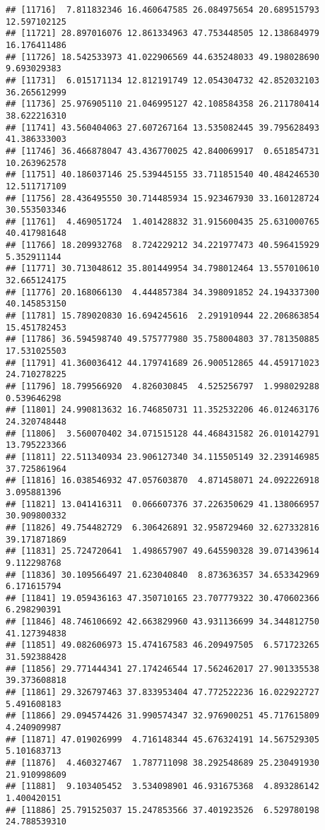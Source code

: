 \documentclass[
]{article}
\begin{document}
\begin{verbatim}
## [11716]  7.811832346 16.460647585 26.084975654 20.689515793 12.597102125
## [11721] 28.897016076 12.861334963 47.753448505 12.138684979 16.176411486
## [11726] 18.542533973 41.022906569 44.635248033 49.198028690  9.693029383
## [11731]  6.015171134 12.812191749 12.054304732 42.852032103 36.265612999
## [11736] 25.976905110 21.046995127 42.108584358 26.211780414 38.622216310
## [11741] 43.560404063 27.607267164 13.535082445 39.795628493 41.386333003
## [11746] 36.466878047 43.436770025 42.840069917  0.651854731 10.263962578
## [11751] 40.186037146 25.539445155 33.711851540 40.484246530 12.511717109
## [11756] 28.436495550 30.714485934 15.923467930 33.160128724 30.553503346
## [11761]  4.469051724  1.401428832 31.915600435 25.631000765 40.417981648
## [11766] 18.209932768  8.724229212 34.221977473 40.596415929  5.352911144
## [11771] 30.713048612 35.801449954 34.798012464 13.557010610 32.665124175
## [11776] 20.168066130  4.444857384 34.398091852 24.194337300 40.145853150
## [11781] 15.789020830 16.694245616  2.291910944 22.206863854 15.451782453
## [11786] 36.594598740 49.575777980 35.758004803 37.781350885 17.531025503
## [11791] 41.360036412 44.179741689 26.900512865 44.459171023 24.710278225
## [11796] 18.799566920  4.826030845  4.525256797  1.998029288  0.539646298
## [11801] 24.990813632 16.746850731 11.352532206 46.012463176 24.320748448
## [11806]  3.560070402 34.071515128 44.468431582 26.010142791 13.795223366
## [11811] 22.511340934 23.906127340 34.115505149 32.239146985 37.725861964
## [11816] 16.038546932 47.057603870  4.871458071 24.092226918  3.095881396
## [11821] 13.041416311  0.066607376 37.226350629 41.138066957 30.909800332
## [11826] 49.754482729  6.306426891 32.958729460 32.627332816 39.171871869
## [11831] 25.724720641  1.498657907 49.645590328 39.071439614  9.112298768
## [11836] 30.109566497 21.623040840  8.873636357 34.653342969  6.171615794
## [11841] 19.059436163 47.350710165 23.707779322 30.470602366  6.298290391
## [11846] 48.746106692 42.663829960 43.931136699 34.344812750 41.127394838
## [11851] 49.082606973 15.474167583 46.209497505  6.571723265 31.592388428
## [11856] 29.771444341 27.174246544 17.562462017 27.901335538 39.373608818
## [11861] 29.326797463 37.833953404 47.772522236 16.022922727  5.491608183
## [11866] 29.094574426 31.990574347 32.976900251 45.717615809  4.240909987
## [11871] 47.019026999  4.716148344 45.676324191 14.567529305  5.101683713
## [11876]  4.460327467  1.787711098 38.292548689 25.230491930 21.910998609
## [11881]  9.103405452  3.534098901 46.931675368  4.893286142  1.400420151
## [11886] 25.791525037 15.247853566 37.401923526  6.529780198 24.788539310

\end{verbatim}
\end{document}
